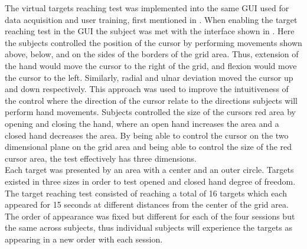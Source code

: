 The virtual targets reaching test was implemented into the same GUI used for data acquisition and user training, first mentioned in . 
When enabling the target reaching test in the GUI the subject was met with the interface shown in . Here the subjects controlled the position of the cursor by performing movements shown above, below, and on the sides of the borders of the grid area. Thus, extension of the hand would move the cursor to the right of the grid, and flexion would move the cursor to the left. Similarly, radial and ulnar deviation moved the cursor up and down respectively. This approach was used to improve the intuitiveness of the control where the direction of the cursor relate to the directions subjects will perform hand movements.
Subjects controlled the size of the cursors red area by opening and closing the hand, where an open hand increases the area and a closed hand decreases the area. By being able to control the cursor on the two dimensional plane on the grid area and being able to control the size of the red cursor area, the test effectively has three dimensions. \\
Each target was presented by an area with a center and an outer circle. Targets existed in three sizes in order to test opened and closed hand degree of freedom. The target reaching test consisted of reaching a total of 16 targets which each appeared for 15 seconds at different distances from the center of the grid area. The order of appearance was fixed but different for each of the four sessions but the same across subjects, thus individual subjects will experience the targets as appearing in a new order with each session. 

